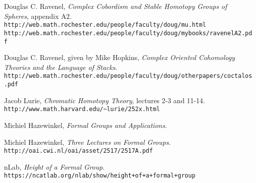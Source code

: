 \begin{thebibliography}{9}
	Douglas C. Ravenel,
	\textit{Complex Cobordism and Stable Homotopy Groups of Spheres}, appendix A2.
	\\\texttt{http://web.math.rochester.edu/people/faculty/doug/mu.html}
	\\\texttt{http://web.math.rochester.edu/people/faculty/doug/mybooks/ravenelA2.pdf}
	
	Douglas C. Ravenel, given by Mike Hopkins,
	\textit{Complex Oriented Cohomology Theories and the Language of Stacks}.
	\\\texttt{http://web.math.rochester.edu/people/faculty/doug/otherpapers/coctalos.pdf}
	
	Jacob Lurie,
	\textit{Chromatic Homotopy Theory}, lectures 2-3 and 11-14.
	\\\texttt{http://www.math.harvard.edu/\~{}lurie/252x.html}
	
	Michiel Hazewinkel,
	\textit{Formal Groups and Applications}.
	
	Michiel Hazewinkel,
	\textit{Three Lectures on Formal Groups}.
	\\\texttt{http://oai.cwi.nl/oai/asset/2517/2517A.pdf}
	
	nLab,
	\textit{Height of a Formal Group}.
	\\\texttt{https://ncatlab.org/nlab/show/height+of+a+formal+group}
\end{thebibliography}
